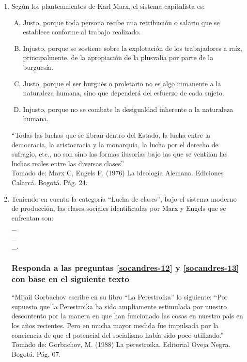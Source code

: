 \begin{enumerate}
\item Según los planteamientos de Karl Marx, el sistema capitalista es:\label{socandres-10}

\begin{enumerate}[(A)]
\item Justo, porque toda persona recibe una retribución o salario que se establece conforme al trabajo realizado.
\item Injusto, porque se sostiene sobre la explotación de los trabajadores a raíz, principalmente, de la apropiación de la plusvalía por parte de la burguesía.
\item Justo, porque el ser burgués o proletario no es algo inmanente a la naturaleza humana, sino que dependerá del esfuerzo de cada sujeto.
\item Injusto, porque no se combate la desigualdad inherente a la naturaleza humana.
\end{enumerate}

``Todas las luchas que se libran dentro del Estado, la lucha entre la democracia, la aristocracia y la monarquía, la lucha por el derecho de sufragio, etc., no son sino las formas ilusorias bajo las que se ventilan las luchas reales entre las diversas clases''\\
{\footnotesize Tomado de: Marx C, Engels F. (1976) La ideología Alemana. Ediciones Calarcá. Bogotá. Pág. 24.}
\item Teniendo en cuenta la categoría “Lucha de clases”, bajo el sistema moderno de producción, las clases sociales identificadas por Marx y Engels que se enfrentan son:\label{socandres-11} \hrulefill\\
\_\hrulefill\\
\_\hrulefill\\
\_\hrulefill.

\subsubsection*{Responda a las preguntas \ref{socandres-12} y \ref{socandres-13} con base en el siguiente texto}

``Mijail Gorbachov escribe en su libro ``La Perestroika'' lo siguiente: ``Por supuesto que la Perestroika ha sido ampliamente estimulada por nuestro descontento por la manera en que han funcionado las cosas en nuestro país en los años recientes. Pero en mucha mayor medida fue impulsada por la conciencia de que el potencial del socialismo había sido poco utilizado.''\\
{\footnotesize Tomado de: Gorbachov, M. (1988) La perestroika. Editorial Oveja Negra. Bogotá. Pág. 07.}


\end{enumerate}
